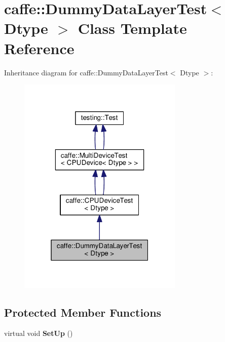 \hypertarget{classcaffe_1_1_dummy_data_layer_test}{}\section{caffe\+:\+:Dummy\+Data\+Layer\+Test$<$ Dtype $>$ Class Template Reference}
\label{classcaffe_1_1_dummy_data_layer_test}


Inheritance diagram for caffe\+:\+:Dummy\+Data\+Layer\+Test$<$ Dtype $>$\+:
\nopagebreak
\begin{figure}[H]
\begin{center}
\leavevmode
\includegraphics[width=223pt]{classcaffe_1_1_dummy_data_layer_test__inherit__graph}
\end{center}
\end{figure}
\subsection*{Protected Member Functions}
\begin{DoxyCompactItemize}
\item 
\mbox{\label{classcaffe_1_1_dummy_data_layer_test_a60e251a35baa18ea76ca057a9ea98e75}} 
virtual void {\bfseries Set\+Up} ()
\end{DoxyCompactItemize}
